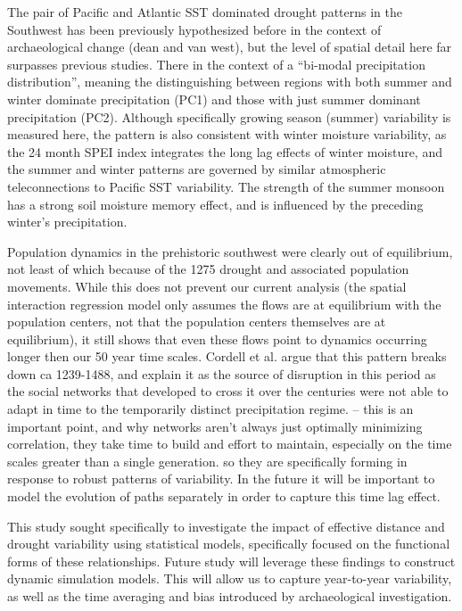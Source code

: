 \documentclass[10pt]{iopart}
\begin{document}
The pair of Pacific and Atlantic SST dominated drought patterns in the Southwest has been previously hypothesized before in the context of archaeological change (dean and van west), but the level of spatial detail here far surpasses previous studies. There in the context of a ``bi-modal precipitation distribution'', meaning the distinguishing between regions with both summer and winter dominate precipitation (PC1) and those with just summer dominant precipitation (PC2). Although specifically growing season (summer) variability is measured here, the pattern is also consistent with winter moisture variability, as the 24 month SPEI index integrates the long lag effects of winter moisture, and the summer and winter patterns are governed by similar atmospheric teleconnections to Pacific SST variability. The strength of the summer monsoon has a strong soil moisture memory effect, and is influenced by the preceding winter's precipitation.

Population dynamics in the prehistoric southwest were clearly out of equilibrium, not least of which because of the 1275 drought and associated population movements. While this does not prevent our current analysis (the spatial interaction regression model only assumes the flows are at equilibrium with the population centers, not that the population centers themselves are at equilibrium), it still shows that even these flows point to dynamics occurring longer then our 50 year time scales. Cordell et al. argue that this pattern breaks down ca 1239-1488, and explain it as the source of disruption in this period as the social networks that developed to cross it over the centuries were not able to adapt in time to the temporarily distinct precipitation regime. -- this is an important point, and why networks aren't always just optimally minimizing correlation, they take time to build and effort to maintain, especially on the time scales greater than a single generation. so they are specifically forming in response to robust patterns of variability. In the future it will be important to model the evolution of paths separately \parencite{Bevan2013} in order to capture this time lag effect.



This study sought specifically to investigate the impact of effective distance and drought variability using statistical models, specifically focused on the functional forms of these relationships. Future study will leverage these findings to construct dynamic simulation models. This will allow us to capture year-to-year variability, as well as the time averaging and bias introduced by archaeological investigation.
\end{document}
